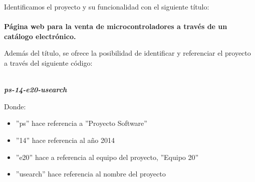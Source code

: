 \noindent Identificamos el proyecto y su funcionalidad con el siguiente título:
\paragraph{}\textbf{\large \indent Página web para la venta de microcontroladores a través de un \newline \indent catálogo electrónico.}

\noindent \newline Además del título, se ofrece la posibilidad de identificar y referenciar el proyecto a través del siguiente código:
\begin{center}
	\textbf{\textit{\large \\ ps-14-e20-usearch}}
\end{center}
Donde:
	\begin{itemize}
	\renewcommand{\labelitemi}{$-$}
		\item ''ps'' hace referencia a ''Proyecto Software''
		\item ''14'' hace referencia al año 2014
		\item ''e20'' hace a referencia al equipo del proyecto, ''Equipo 20''
		\item ''usearch'' hace referencia al nombre del proyecto
	\end{itemize}